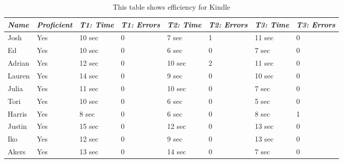\documentclass[12pt,letterpaper]{article}
\begin{document}
    \begin{table}
        \centering
        \begin{tabular}{|l|l|l|l|l|l|l|l|}
            \hline
            \emph{Name} & \emph{Proficient} & \emph{T1: Time} & \emph{T1: Errors} & \emph{T2: Time} & \emph{T2: Errors} & \emph{T3: Time} & \emph{T3: Errors} \\
            \hline
            Josh & Yes & 10 sec & 0 & 7 sec & 1 & 11 sec & 0 \\
            \hline
            Ed & Yes & 10 sec & 0 & 6 sec & 0 & 7 sec & 0 \\
            \hline
            Adrian & Yes & 12 sec & 0 & 10 sec & 2 & 11 sec & 0 \\
            \hline
            Lauren & Yes & 14 sec & 0 & 9 sec & 0 & 10 sec & 0 \\
            \hline
            Julia & Yes & 11 sec & 0 & 10 sec & 0 & 7 sec & 0 \\
            \hline
            Tori & Yes & 10 sec & 0 & 6 sec & 0 & 5 sec & 0 \\
            \hline
            Harris & Yes & 8 sec & 0 & 6 sec & 0 & 8 sec & 1 \\
            \hline
            Justin & Yes & 15 sec & 0 & 12 sec & 0 & 13 sec & 0 \\
            \hline
            Iko & Yes & 12 sec & 0 & 9 sec & 0 & 13 sec & 0 \\
            \hline
            Akers & Yes & 13 sec & 0 & 14 sec & 0 & 7 sec & 0 \\
        \end{tabular}
        \caption{This table shows efficiency for Kindle}
    \end{table}
\end{document}
